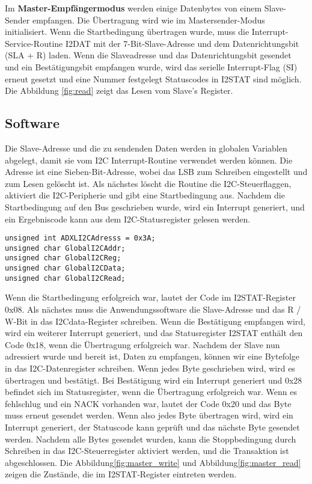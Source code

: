 Im \textbf{Master-Empfängermodus} werden einige Datenbytes von einem Slave-Sender empfangen. Die Übertragung wird wie im Mastersender-Modus initialisiert. Wenn die Startbedingung übertragen wurde, muss die Interrupt-Service-Routine I2DAT mit der 7-Bit-Slave-Adresse und dem Datenrichtungsbit (SLA + R) laden. Wenn die Slaveadresse und das Datenrichtungsbit gesendet und ein Bestätigungsbit empfangen wurde, wird das serielle Interrupt-Flag (SI) erneut gesetzt und eine Nummer festgelegt Statuscodes in I2STAT sind möglich. Die Abbildung \ref{fig:read} zeigt das Lesen vom Slave's Register.

\subsection{Software}
Die Slave-Adresse und die zu sendenden Daten werden in globalen Variablen abgelegt, damit sie vom I2C Interrupt-Routine verwendet werden können. Die Adresse ist eine Sieben-Bit-Adresse, wobei das LSB zum Schreiben eingestellt und zum Lesen gelöscht ist. Als nächstes löscht die Routine die I2C-Steuerflaggen, aktiviert die I2C-Peripherie und gibt eine Startbedingung aus. Nachdem die Startbedingung auf den Bus geschrieben wurde, wird ein Interrupt generiert, und ein Ergebniscode kann aus dem I2C-Statusregister gelesen werden.

\begin{lstlisting}
unsigned int ADXLI2CAdresss = 0x3A;
unsigned char GlobalI2CAddr;
unsigned char GlobalI2CReg;
unsigned char GlobalI2CData;
unsigned char GlobalI2CRead;
\end{lstlisting}

Wenn die Startbedingung erfolgreich war, lautet der Code im I2STAT-Register 0x08. Als nächstes muss die Anwendungssoftware die Slave-Adresse und das R / W-Bit in das I2Cdata-Register schreiben. Wenn die Bestätigung empfangen wird, wird ein weiterer Interrupt generiert, und das Statusregister I2STAT enthält den Code 0x18, wenn die Übertragung erfolgreich war. Nachdem der Slave nun adressiert wurde und bereit ist, Daten zu empfangen, können wir eine Bytefolge in das I2C-Datenregister schreiben. Wenn jedes Byte geschrieben wird, wird es übertragen und bestätigt. Bei Bestätigung wird ein Interrupt generiert und 0x28 befindet sich im Statusregister, wenn die Übertragung erfolgreich war. Wenn es fehlschlug und ein NACK vorhanden war, lautet der Code 0x20 und das Byte muss erneut gesendet werden. Wenn also jedes Byte übertragen wird, wird ein Interrupt generiert, der Statuscode kann geprüft und das nächste Byte gesendet werden. Nachdem alle Bytes gesendet wurden, kann die Stoppbedingung durch Schreiben in das I2C-Steuerregister aktiviert werden, und die Transaktion ist abgeschlossen. Die Abbildung\ref{fig:master_write} und  Abbildung\ref{fig:master_read} zeigen die Zustände, die im I2STAT-Register eintreten werden.

